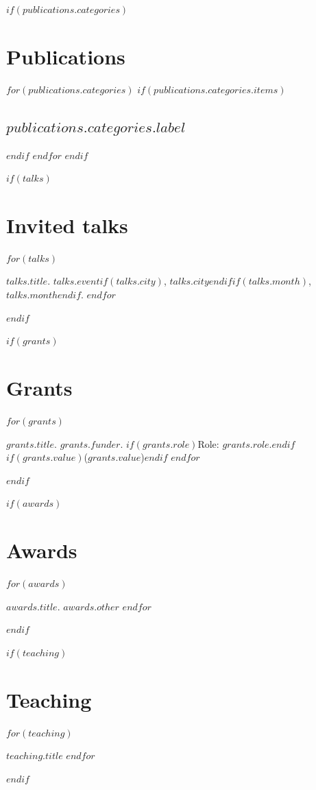 \documentclass[11pt]{article}
\begin{document}
$if(publications.categories)$
\section{Publications}
$for(publications.categories)$
$if(publications.categories.items)$
\subsection*{$publications.categories.label$}
\begin{refsection}
\nocite{$for(publications.categories.items)$$publications.categories.items$$sep$, $endfor$}
\printbibliography[heading=none]
\end{refsection}
\vspace{0.6em}
$endif$
$endfor$
$endif$

$if(talks)$
\section{Invited talks}
\begin{cvdesc}
$for(talks)$
\item[$talks.year$] $talks.title$. $talks.event$$if(talks.city)$, $talks.city$$endif$$if(talks.month)$, $talks.month$$endif$.
$endfor$
\end{cvdesc}
$endif$

$if(grants)$
\section{Grants}
\begin{cvdesc}
$for(grants)$
\item[$grants.start$--$grants.end$] $grants.title$. $grants.funder$. $if(grants.role)$Role: $grants.role$.$endif$ $if(grants.value)$($grants.value$)$endif$
$endfor$
\end{cvdesc}
$endif$

$if(awards)$
\section{Awards}
\begin{cvdesc}
$for(awards)$
\item[$awards.start$$if(awards.end)$--$awards.end$$endif$] $awards.title$. $awards.other$
$endfor$
\end{cvdesc}
$endif$

$if(teaching)$
\section{Teaching}
\begin{cvdesc}
$for(teaching)$
\item[$teaching.start$$if(teaching.end)$--$teaching.end$$endif$] $teaching.title$
$endfor$
\end{cvdesc}
$endif$
\end{document}
